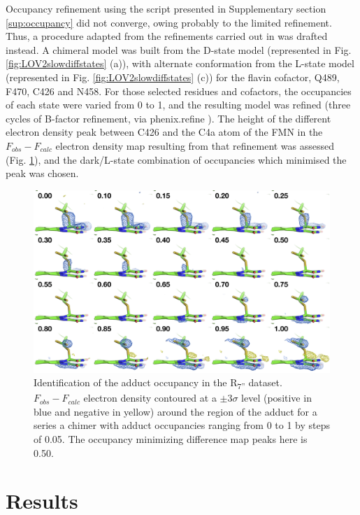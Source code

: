 Occupancy refinement using the script presented in Supplementary section \ref{sup:occupancy} did not converge, owing probably to the limited refinement. Thus, a procedure adapted from the refinements carried out in \cite{nangoThreedimensionalMovieStructural2016} was drafted instead. A chimeral model was built from the D-state model (represented in Fig. \ref{fig:LOV2slowdiffstates} (a)), with alternate conformation from the L-state model (represented in Fig. \ref{fig:LOV2slowdiffstates} (c)) for the flavin cofactor, Q489, F470, C426 and N458. For those selected residues and cofactors, the occupancies of each state were varied from 0 to 1, and the resulting model was refined (three cycles of B-factor refinement, via phenix.refine \parencite{liebschnerMacromolecularStructureDetermination2019}). The height of the different electron density peak between C426 and the C4a atom of the FMN in the \(F_{obs} - F_{calc}\) electron density map resulting from that refinement was assessed (Fig. \ref{fig:occupancies}), and the dark/L-state combination of occupancies which minimised the peak was chosen. 

\begin{figure}[H] %
    \centering
    \noindent \includegraphics[width=\textwidth]{images/LOV2/FigS6.pdf}
    \hfill
    \caption{Identification of the adduct occupancy in the R\textsubscript{7”} dataset. \(F_{obs} - F_{calc}\) electron density contoured at a \(\pm 3 \sigma\) level (positive in blue and negative in yellow) around the region of the adduct for a series a chimer with adduct occupancies ranging from 0 to 1 by steps of 0.05. The occupancy minimizing difference map peaks here is 0.50.}
    \label{fig:occupancies}
\end{figure}

\section{Results}
